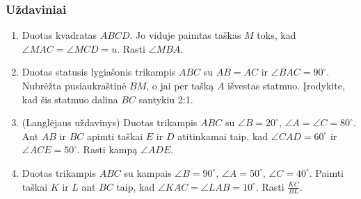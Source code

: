 \subsubsection{Uždaviniai}
\begin{enumerate}
\item Duotas kvadratas $ABCD$. Jo viduje paimtas taškas $M$
  toks, kad $\angle MAC=\angle MCD=u$. Rasti $\angle MBA$. 
\item Duotas statusis lygiašonis trikampis $ABC$ su $AB=AC$
  ir $\angle BAC=90^\circ$. Nubrėžta pusiaukraštinė $BM$, o
  jai per tašką $A$ išvestas statmuo. Įrodykite, kad šis
  statmuo dalina $BC$ santykiu 2:1.
\item (Langlėjaus uždavinys) Duotas trikampis $ABC$ su
  $\angle B=20^\circ$, $\angle A=\angle C=80^\circ$. Ant
  $AB$ ir $BC$ apimti taškai $E$ ir $D$ atitinkamai taip,
  kad $\angle CAD=60^\circ$ ir $\angle ACE=50^\circ$. Rasti
  kampą $\angle ADE$.
\item Duotas trikampis $ABC$ su kampais $\angle B=90^\circ$,
  $\angle A=50^\circ$, $\angle C=40^\circ$. Paimti taškai
  $K$ ir $L$ ant $BC$ taip, kad $\angle KAC=\angle
  LAB=10^\circ$. Rasti $\frac{KC}{BL}$.

\end{enumerate}
